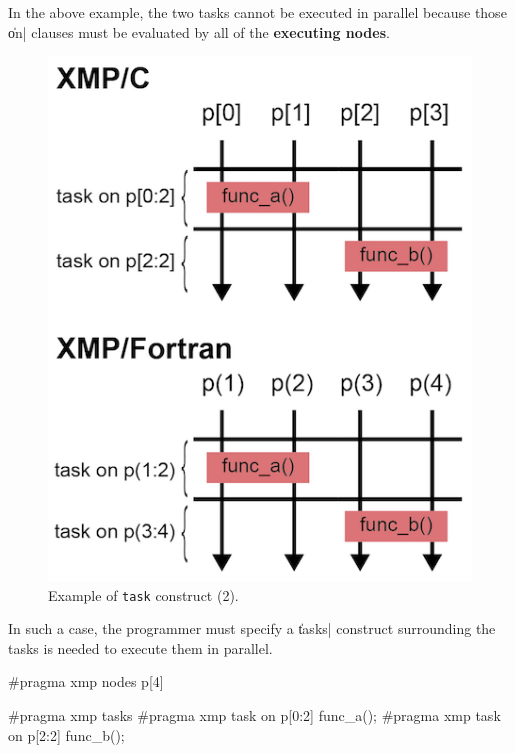 In the above example, the two tasks cannot be executed in parallel
because those \|on| clauses must be evaluated by all of the {\bf
executing nodes}.

\begin{figure}
  \centering
  \includegraphics{figs/task_noparallel.png}
  \caption{Example of {\tt task} construct (2).}
\end{figure}

In such a case, the programmer must specify a \|tasks| construct
surrounding the tasks is needed to execute them in parallel.

\begin{XCexample}
#pragma xmp nodes p[4]

#pragma xmp tasks
{
#pragma xmp task on p[0:2]
{
  func_a();
}
#pragma xmp task on p[2:2]
{
  func_b();
}
}
\end{XCexample}


